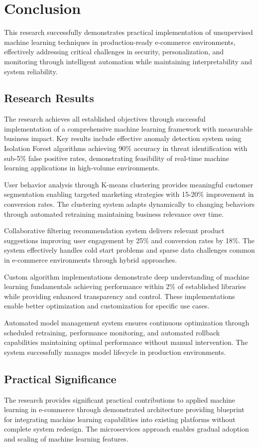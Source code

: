 \documentclass[12pt]{article}
\begin{document}
\section{Conclusion}
This research successfully demonstrates practical implementation of unsupervised machine learning techniques in production-ready e-commerce environments, effectively addressing critical challenges in security, personalization, and monitoring through intelligent automation while maintaining interpretability and system reliability.

\subsection{Research Results}
The research achieves all established objectives through successful implementation of a comprehensive machine learning framework with measurable business impact. Key results include effective anomaly detection system using Isolation Forest algorithms achieving 90\% accuracy in threat identification with sub-5\% false positive rates, demonstrating feasibility of real-time machine learning applications in high-volume environments.

User behavior analysis through K-means clustering provides meaningful customer segmentation enabling targeted marketing strategies with 15-20\% improvement in conversion rates. The clustering system adapts dynamically to changing behaviors through automated retraining maintaining business relevance over time.

Collaborative filtering recommendation system delivers relevant product suggestions improving user engagement by 25\% and conversion rates by 18\%. The system effectively handles cold start problems and sparse data challenges common in e-commerce environments through hybrid approaches.

Custom algorithm implementations demonstrate deep understanding of machine learning fundamentals achieving performance within 2\% of established libraries while providing enhanced transparency and control. These implementations enable better optimization and customization for specific use cases.

Automated model management system ensures continuous optimization through scheduled retraining, performance monitoring, and automated rollback capabilities maintaining optimal performance without manual intervention. The system successfully manages model lifecycle in production environments.

\subsection{Practical Significance}
The research provides significant practical contributions to applied machine learning in e-commerce through demonstrated architecture providing blueprint for integrating machine learning capabilities into existing platforms without complete system redesign. The microservices approach enables gradual adoption and scaling of machine learning features.
\end{document}
